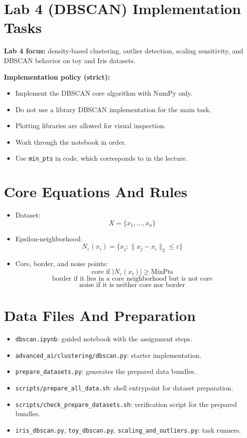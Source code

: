 \section*{Lab 4 (DBSCAN) Implementation Tasks}
\textbf{Lab 4 focus:} density-based clustering, outlier detection, scaling sensitivity, and DBSCAN behavior on toy and Iris datasets.

\medskip
\textbf{Implementation policy (strict):}
\begin{itemize}
  \item Implement the DBSCAN core algorithm with NumPy only.
  \item Do not use a library DBSCAN implementation for the main task.
  \item Plotting libraries are allowed for visual inspection.
  \item Work through the notebook in order.
  \item Use \texttt{min\_pts} in code, which corresponds to  in the lecture.
\end{itemize}

\section*{Core Equations And Rules}
\begin{itemize}
  \item Dataset:
  \[
    X = \{x_1,\dots,x_n\}
  \]
  \item Epsilon-neighborhood:
  \[
    N_\varepsilon(x_i) = \{x_j : \|x_j - x_i\|_2 \le \varepsilon\}
  \]
  \item Core, border, and noise points:
  \[
    \text{core if } |N_\varepsilon(x_i)| \ge \text{MinPts}
  \]
  \[
    \text{border if it lies in a core neighborhood but is not core}
  \]
  \[
    \text{noise if it is neither core nor border}
  \]
\end{itemize}

\section*{Data Files And Preparation}
\begin{itemize}
  \item \texttt{dbscan.ipynb}: guided notebook with the assignment steps.
  \item \texttt{advanced\_ai/clustering/dbscan.py}: starter implementation.
  \item \texttt{prepare\_datasets.py}: generates the prepared data bundles.
  \item \texttt{scripts/prepare\_all\_data.sh}: shell entrypoint for dataset preparation.
  \item \texttt{scripts/check\_prepare\_datasets.sh}: verification script for the prepared bundles.
  \item \texttt{iris\_dbscan.py}, \texttt{toy\_dbscan.py}, \texttt{scaling\_and\_outliers.py}: task runners.
\end{itemize}

